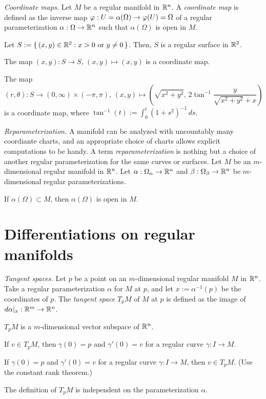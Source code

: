 \documentclass{../note}
\def\a{\alpha}
\begin{document}
\begin{prb}\emph{Coordinate maps.}
Let $M$ be a regular manifold in $\mathbb{R}^n$.
A \emph{coordinate map} is defined as the inverse map $\f:U=\a(\Omega)\to\f(U)=\Omega$ of a regular parameterization $\a:\Omega\to\R^n$ such that $\a(\Omega)$ is open in $M$.

Let $S:=\{\,(x,y)\in\mathbb{R}^2:x>0\text{ or }y\ne0\,\}$.
Then, $S$ is a regular surface in $\mathbb{R}^2$.
\begin{parts}
\item The map $(x,y):S\to S,\,(x,y)\mapsto(x,y)$ is a coordinate map.
\item The map
\[(r,\theta):S\to(0,\infty)\times(-\pi,\pi),\,(x,y)\mapsto\left(\sqrt{x^2+y^2},\,2\tan^{-1}\frac y{\sqrt{x^2+y^2}+x}\right)\]
is a coordinate map, where $\tan^{-1}(t):=\int_0^t(1+s^2)^{-1}\,ds$.
\end{parts}
\end{prb}


\begin{prb}\emph{Reparameterization.}
A manifold can be analyzed with uncountably many coordiante charts, and an appropriate choice of charts allows explicit computations to be handy.
A term \emph{reparameterization} is nothing but a choice of another regular parameterization for the same curves or surfaces.
Let $M$ be an $m$-dimensional regular manifold in $\mathbb{R}^n$.
Let $\a:\Omega_\a\to\R^n$ and $\beta:\Omega_\beta\to\mathbb{R}^n$ be $m$-dimensional regular parameterizations.
\begin{parts}
\item If $\a(\Omega)\subset M$, then $\a(\Omega)$ is open in $M$.
\end{parts}
\end{prb}


\section{Differentiations on regular manifolds}


\begin{prb}\emph{Tangent spaces.}
Let $p$ be a point on an $m$-dimensional regular manifold $M$ in $\mathbb{R}^n$.
Take a regular parameterization $\a$ for $M$ at $p$, and let $x:=\a^{-1}(p)$ be the coordinates of $p$.
The \emph{tangent space} $T_pM$ of $M$ at $p$ is defined as the image of $d\a|_x:\R^m\to\R^n$.
\begin{parts}
\item $T_pM$ is a $m$-dimensional vector subspace of $\mathbb{R}^n$.
\item If $v\in T_pM$, then $\gamma(0)=p$ and $\gamma'(0)=v$ for a regular curve $\gamma:I\to M$.
\item If $\gamma(0)=p$ and $\gamma'(0)=v$ for a regular curve $\gamma:I\to M$, then $v\in T_pM$. (Use the constant rank theorem.)
\item The definition of $T_pM$ is independent on the parameterization $\a$.
\end{parts}
\end{prb}
\end{document}
